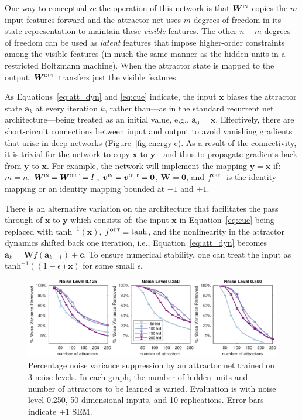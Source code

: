 \documentclass{article}
\newcommand{\Win}{{\ensuremath{\bm{W}^{\textsc{in}}}}}
\newcommand{\vin}{{\ensuremath{\bm{v}^{\textsc{in}}}}}
\newcommand{\Wout}{{\ensuremath{\bm{W}^{\textsc{out}}}}}
\newcommand{\vout}{{\ensuremath{\bm{v}^{\textsc{out}}}}}
\newcommand{\fout}{{\ensuremath{f^{\textsc{out}}}}}
\newcommand{\cue}{{\ensuremath{\bm{c}}}}
\begin{document}
One way to conceptualize the operation of this network is that $\Win$ copies
the $m$ input features forward and the attractor net uses $m$ degrees of
freedom in its state representation to maintain these \emph{visible} features.
The other $n-m$ degrees of freedom can be used as \emph{latent} features that
impose higher-order constraints among the visible features (in much the same
manner as the hidden units in a restricted Boltzmann machine).  When the
attractor state is mapped to the output, $\Wout$ transfers just the visible
features.

As Equations~\ref{eq:att_dyn} and \ref{eq:cue} indicate, the input $\bm{x}$
biases the attractor state $\bm{a}_k$ at every iteration $k$, rather than---as
in the standard recurrent net architecture---being treated as an initial value,
e.g., $\bm{a}_0 = \bm{x}$. Effectively, there are short-circuit connections
between input and output to avoid vanishing gradients that arise in deep
networks (Figure~\ref{fig:energy}c). As a result of the connectivity, it is
trivial for the network to copy $\bm{x}$ to $\bm{y}$---and thus to propagate
gradients back from $\bm{y}$ to $\bm{x}$. For example, the network will
implement the mapping $\bm{y} = \bm{x}$ if: $m=n$, $\Win = \Wout  = I$, $\vin =
\vout = \bm{0}$, $\bm{W}=\bm{0}$, and $\fout$ is the identity mapping or an
identity mapping bounded at $-1$ and $+1$.

There is an alternative variation on the architecture that facilitates the pass
through of $\bm{x}$ to $\bm{y}$ which consists of: the input $\bm{x}$ in
Equation~\ref{eq:cue} being replaced with $\mathrm{tanh}^{-1}(\bm{x})$, $\fout
\equiv \mathrm{tanh}$, and the nonlinearity in the attractor dynamics 
shifted back one iteration, i.e., Equation~\ref{eq:att_dyn} becomes $\bm{a}_{k}
= \bm{W} f(\bm{a}_{k-1}) + \cue$. To ensure numerical stability, one can
treat the input as $\mathrm{tanh}^{-1}((1-\epsilon) \bm{x})$ for some small 
$\epsilon$.

\begin{figure}[bt]%
   \begin{center}
   \includegraphics[width=5.5in]{fig/plot_attractor_performance.pdf}
   \end{center}
   \caption{Percentage noise variance suppression by an attractor net trained 
   on 3 noise levels. In each graph, the number of hidden units and number 
   of attractors to be learned is varied.  Evaluation is with 
   noise level 0.250, 50-dimensional inputs, and 10 replications. 
   Error bars indicate $\pm1$ SEM.}
   \label{fig:attractor_alone}
\end{figure}
\end{document}
